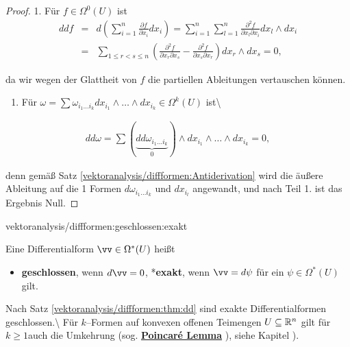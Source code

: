 \begin{proof}
 1. Für \(f\in\Omega^0(U)\) ist
\begin{align*}
ddf &=& d\left(\sum_{i=1}^n\frac{\partial f}
{\partial x_i}dx_i\right) = \sum_{i=1}^n\sum_{l=1}^n\frac{\partial^2f}{\partial x_l\partial x_i}
dx_l\wedge dx_i\\
& =& \sum_{1\leq r< s\leq n}\left(\frac{\partial^2 f}{\partial x_r
\partial x_s} - \frac{\partial^2f}{\partial x_s\partial x_r}\right)dx_r\wedge dx_s = 0,
\end{align*}
\par
da wir wegen der Glattheit von \(f\) die partiellen Ableitungen vertauschen
können.
\begin{enumerate}

\item {} 
\par
Für \(\omega = \sum\omega_{i_1\ldots i_k}dx_{i_1}\wedge\ldots\wedge dx_{i_k}
\in\Omega^k(U)\) ist\textbackslash{}

\end{enumerate}
\begin{align*}
dd\omega = \sum(\underbrace{dd\omega_{i_1\ldots i_k}}_0)
\wedge dx_{i_1}\wedge\ldots\wedge dx_{i_k} = 0,
\end{align*}
\par
denn gemäß Satz \cref{vektoranalysis/diffformen:Antiderivation} wird die äußere Ableitung auf die
1 Formen \(d\omega_{i_1\ldots i_k}\) und \(dx_{i_l}\) angewandt, und nach Teil 1.
ist das Ergebnis Null.
\end{proof}
\begin{definition}{}{vektoranalysis/diffformen:geschlossen:exakt}



\par
Eine Differentialform \(\vv\in\Omega^*(U)\) heißt
\begin{itemize}
\item {} 
\par
\textbf{geschlossen}, wenn \(d\vv=0\), *\textbf{exakt}, wenn \(\vv=d\psi\) für ein \(\psi\in\Omega^*(U)\) gilt.

\end{itemize}

\par
Nach Satz \cref{vektoranalysis/diffformen:thm:dd} sind exakte Differentialformen geschlossen.\textbackslash{} Für \(k\)–Formen auf konvexen offenen Teimengen \(U\subseteq \mathbb{R}^n\) gilt für \(k\ge 1\)auch die Umkehrung (sog.
\href{https://de.wikipedia.org/wiki/Poincar\%c3\%a9-Lemma}{\textbf{Poincaré Lemma}} ),  siehe Kapitel ).
\end{definition}


